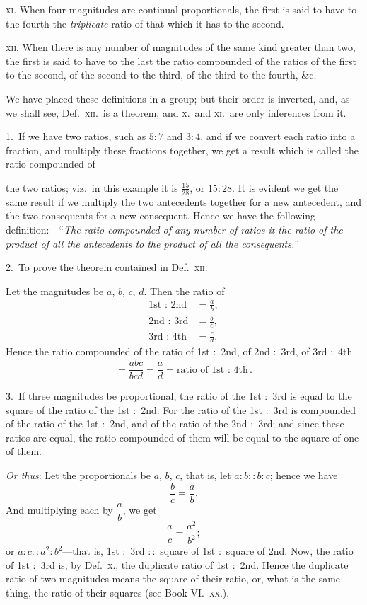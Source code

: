 \documentclass[oneside]{book}
\begin{document}
\textsc{xi}. When four magnitudes are continual proportionals,
the first is said to have to the fourth the
\emph{triplicate} ratio of that which it has to the second.

\textsc{xii}. When there is any number of magnitudes of the
same kind greater than two, the first is said to have to
the last the ratio compounded of the ratios of the first
to the second, of the second to the third, of the third
to the fourth, \&c.

\smallskip
\begin{footnotesize}
We have placed these definitions in a group; but their order
is inverted, and, as we shall see, Def.~\textsc{xii}.\ is a theorem, and \textsc{x}.\
and \textsc{xi}.\ are only inferences from it.

1.~If we have two ratios, such as $5 : 7$ and $3 : 4$, and if we
convert each ratio into a fraction, and multiply these fractions
together, we get a result which is called the ratio compounded of

the two ratios; viz.~in this example it is $\frac{15}{28}$, or $15 : 28$. It is
evident we get the same result if we multiply the two antecedents
together for a new antecedent, and the two consequents for a
new consequent. Hence we have the following definition:---``\emph{The
ratio compounded\index{Ratio!compound} of any number of ratios it the ratio of
the product of all the antecedents to the product of all the consequents.}''

2.~To prove the theorem contained in Def.~\textsc{xii}.

Let the magnitudes be $a$, $b$, $c$, $d$. Then the ratio of
\begin{align*}
\text{1st $:$ 2nd} & = \frac{a}{b}, \\
\text{2nd $:$ 3rd} & = \frac{b}{c}, \\
\text{3rd $:$ 4th} & = \frac{c}{d}.
\end{align*}
Hence the ratio compounded of the ratio of 1st $:$ 2nd, of 2nd $:$ 3rd,
of 3rd $:$ 4th
\[
= \frac{abc}{bcd} = \frac{a}{d} = \text{ratio of 1st $:$ 4th}.
\]

3.~If three magnitudes be proportional, the ratio of the 1st $:$ 3rd
is equal to the square of the ratio of the 1st $:$ 2nd. For the ratio
of the 1st $:$ 3rd is compounded of the ratio of the 1st $:$ 2nd, and
of the ratio of the 2nd $:$ 3rd; and since these ratios are equal,
the ratio compounded of them will be equal to the square of one
of them.

\emph{Or thus}: Let the proportionals be $a$, $b$, $c$, that is, let $a : b :: b : c$;
hence we have
\[
\frac{b}{c} = \frac{a}{b}.
\]
And multiplying each by $\dfrac{a}{b}$, we get
\[
\frac{a}{c} = \frac{a^2}{b^2};
\]
or $a : c :: a^2 : b^2$---that is, 1st $:$ 3rd $::$ square of 1st $:$ square of 2nd.
Now, the ratio of 1st $:$ 3rd is, by Def.~\textsc{x}., the duplicate ratio of
1st $:$ 2nd. Hence the duplicate ratio\index{Ratio!duplicate} of two magnitudes means
the square of their ratio, or, what is the same thing, the ratio of
their squares (see Book VI\@.\ \textsc{xx}.).



\end{footnotesize}
\end{document}
